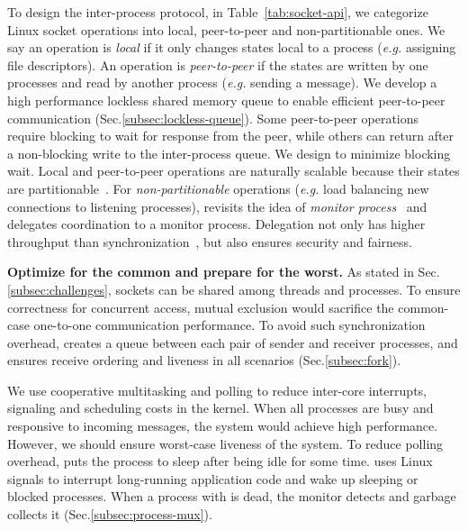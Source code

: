 To design the inter-process protocol, in Table~\ref{tab:socket-api}, we categorize Linux socket operations into local, peer-to-peer and non-partitionable ones. We say an operation is \textit{local} if it only changes states local to a process (\textit{e.g.} assigning file descriptors). An operation is \textit{peer-to-peer} if the states are written by one processes and read by another process (\textit{e.g.} sending a message). We develop a high performance lockless shared memory queue to enable efficient peer-to-peer communication (Sec.\ref{subsec:lockless-queue}). Some peer-to-peer operations require blocking to wait for response from the peer, while others can return after a non-blocking write to the inter-process queue. We design to minimize blocking wait. Local and peer-to-peer operations are naturally scalable because their states are partitionable~\cite{partitionable}. For \textit{non-partitionable} operations (\textit{e.g.} load balancing new connections to listening processes), \libipc revisits the idea of \textit{monitor process}~\cite{hoare1974monitors} and delegates coordination to a monitor process. Delegation not only has higher throughput than synchronization~\cite{roghanchi2017ffwd}, but also ensures security and fairness.


\textbf{Optimize for the common and prepare for the worst.}
As stated in Sec.\ref{subsec:challenges}, sockets can be shared among threads and processes. To ensure correctness for concurrent access, mutual exclusion would sacrifice the common-case one-to-one communication performance. To avoid such synchronization overhead, \libipc creates a queue between each pair of sender and receiver processes, and ensures receive ordering and liveness in all scenarios (Sec.\ref{subsec:fork}).

We use cooperative multitasking and polling to reduce inter-core interrupts, signaling and scheduling costs in the kernel. When all processes are busy and responsive to incoming messages, the system would achieve high performance. However, we should ensure worst-case liveness of the system. To reduce polling overhead, \libipc puts the process to sleep after being idle for some time. \libipc uses Linux signals to interrupt long-running application code and wake up sleeping or blocked processes. When a process with \libipc is dead, the monitor detects and garbage collects it (Sec.\ref{subsec:process-mux}).

